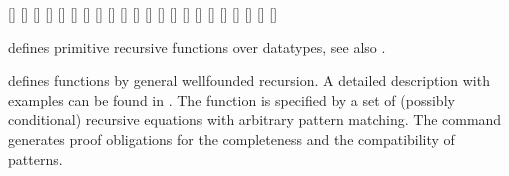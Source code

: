 \begin{isabellebody}
\begin{isamarkuptext}
  \begin{railoutput}
[]
\rail@bar
{}
[]
\rail@endbar
{}[]
[]
[]
\rail@end
{}
\rail@bar
{}[]
[]
\rail@endbar
\rail@bar
{}
[]
\rail@endbar
\rail@bar
{}
[]
\rail@endbar
{}[]
[]
[]
\rail@end
{}
\rail@plus
\rail@bar
{}
[]
\rail@endbar
{}[]
[]
\rail@endplus
\rail@end
{}
[]
\rail@plus
\rail@bar
{}[]
[]
\rail@endbar
{}
[]
\rail@endplus
{}[]
\rail@end
{}
[]
\rail@bar
{}
[]
\rail@endbar
\rail@end
\end{railoutput}


  \begin{description}

  \item \hyperlink{command.HOL.primrec}{\mbox{}} defines primitive recursive
  functions over datatypes, see also \cite{isabelle-HOL}.

  \item \hyperlink{command.HOL.function}{\mbox{}} defines functions by general
  wellfounded recursion. A detailed description with examples can be
  found in \cite{isabelle-function}. The function is specified by a
  set of (possibly conditional) recursive equations with arbitrary
  pattern matching. The command generates proof obligations for the
  completeness and the compatibility of patterns.


\end{description}
\end{isamarkuptext}
\end{isabellebody}
